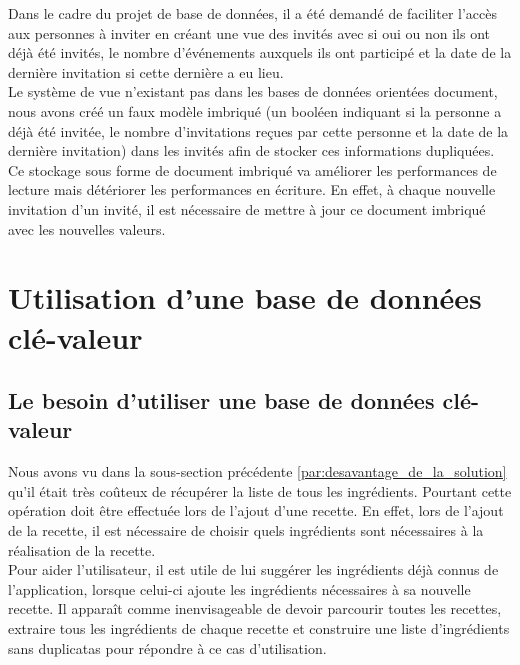 		Dans le cadre du projet de base de données, il a été demandé de faciliter l'accès aux personnes à inviter en créant une vue des invités avec si oui ou non ils ont déjà été invités, le nombre d’événements auxquels ils ont participé et la date de la dernière invitation si cette dernière a eu lieu.\\

		Le système de vue n'existant pas dans les bases de données orientées document, nous avons créé un faux modèle imbriqué (un booléen indiquant si la personne a déjà été invitée, le nombre d'invitations reçues par cette personne et la date de la dernière invitation) dans les invités afin de stocker ces informations dupliquées. Ce stockage sous forme de document imbriqué va améliorer les performances de lecture mais détériorer les performances en écriture. En effet, à chaque nouvelle invitation d'un invité, il est nécessaire de mettre à jour ce document imbriqué avec les nouvelles valeurs.


\section{Utilisation d'une base de données clé-valeur}
	\subsection{Le besoin d'utiliser une base de données clé-valeur }
		Nous avons vu dans la sous-section précédente \ref{par:desavantage_de_la_solution} qu'il était très coûteux de récupérer la liste de tous les ingrédients. Pourtant cette opération doit être effectuée lors de l'ajout d'une recette. En effet, lors de l'ajout de la recette, il est nécessaire de choisir quels ingrédients sont nécessaires à la réalisation de la recette.\\

		Pour aider l'utilisateur, il est utile de lui suggérer les ingrédients déjà connus de l'application, lorsque celui-ci ajoute les ingrédients nécessaires à sa nouvelle recette. Il apparaît comme inenvisageable de devoir parcourir toutes les recettes, extraire tous les ingrédients de chaque recette et construire une liste d'ingrédients sans duplicatas pour répondre à ce cas d'utilisation.\\

